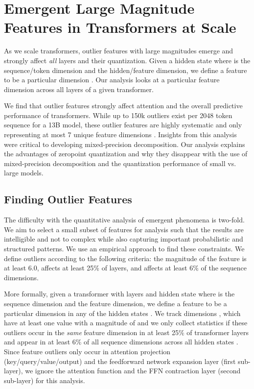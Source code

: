 \documentclass{article}
\begin{document}
\section{Emergent Large Magnitude Features in Transformers at Scale}
\label{sec:emergence}

As we scale transformers, outlier features with large magnitudes emerge and strongly affect {\it all} layers and their quantization. Given a hidden state  where  is the sequence/token dimension and  the hidden/feature dimension, we define a feature to be a particular dimension . Our analysis looks at a particular feature dimension  across all layers of a given transformer.

We find that outlier features strongly affect attention and the overall predictive performance of transformers. While up to 150k outliers exist per 2048 token sequence for a 13B model, these outlier features are highly systematic and only representing at most 7 unique feature dimensions . Insights from this analysis were critical to developing mixed-precision decomposition. Our analysis explains the advantages of zeropoint quantization and why they disappear with the use of mixed-precision decomposition and the quantization performance of small vs. large models.

\subsection{Finding Outlier Features}
\vspace{-0.5em}

The difficulty with the quantitative analysis of emergent phenomena is two-fold. We aim to select a small subset of features for analysis such that the results are intelligible and not to complex while also capturing important probabilistic and structured patterns. We use an empirical approach to find these constraints.
We define outliers according to the following criteria: the magnitude of the feature is at least 6.0, affects at least 25\% of layers, and affects at least 6\% of the sequence dimensions. 

More formally, given a transformer with  layers and hidden state  where  is the sequence dimension and  the feature dimension, we define a feature to be a particular dimension  in any of the hidden states . We track dimensions , which have at least one value with a magnitude of  and we only collect statistics if these outliers occur in the {\it same} feature dimension  in at least 25\% of transformer layers  and appear in at least 6\% of all sequence dimensions  across all hidden states . Since feature outliers only occur in attention projection (key/query/value/output) and the feedforward network expansion layer (first sub-layer), we ignore the attention function and the FFN contraction layer (second sub-layer) for this analysis.
\end{document}
